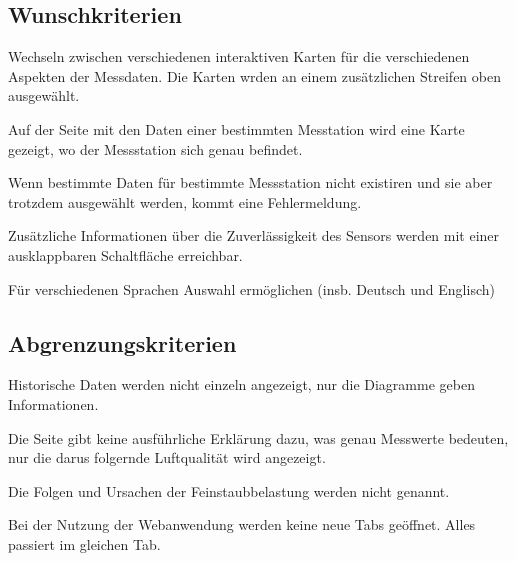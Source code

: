 \newpage
\subsection{Wunschkriterien}
\begin{Kriterien}

	\item Wechseln zwischen verschiedenen interaktiven Karten für die verschiedenen Aspekten der Messdaten. Die Karten wrden an einem zusätzlichen Streifen oben ausgewählt.
	
	\item Auf der Seite mit den Daten einer bestimmten Messtation wird eine Karte gezeigt, wo der Messstation sich genau befindet. 
	
	\item Wenn bestimmte Daten für bestimmte Messstation nicht existiren und sie aber trotzdem ausgewählt werden, kommt eine Fehlermeldung.
	
	\item Zusätzliche Informationen über die Zuverlässigkeit des Sensors werden mit einer ausklappbaren Schaltfläche erreichbar.
	
	\item Für verschiedenen Sprachen Auswahl ermöglichen (insb. Deutsch und Englisch)
	
\end{Kriterien}

\subsection{Abgrenzungskriterien}
\begin{Kriterien}

	\item Historische Daten werden nicht einzeln angezeigt, nur die Diagramme geben Informationen.
	
	\item Die Seite gibt keine ausführliche Erklärung dazu, was  genau Messwerte bedeuten, nur die darus folgernde Luftqualität wird angezeigt. 
	
	\item Die Folgen und Ursachen der Feinstaubbelastung werden nicht genannt.
	
	\item Bei der Nutzung der Webanwendung werden keine neue Tabs geöffnet. Alles passiert im gleichen Tab.
	
\end{Kriterien}
